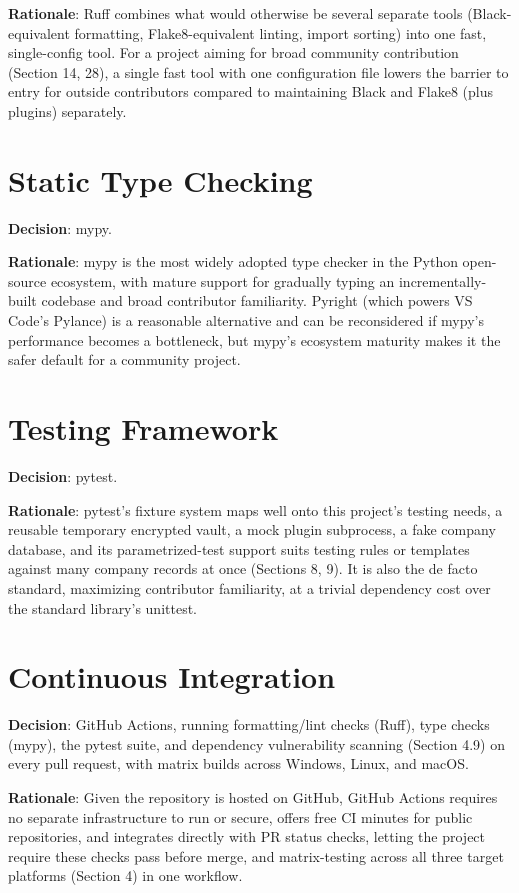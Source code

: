 \textbf{Rationale}:  Ruff combines what would otherwise be several separate tools (Black-equivalent formatting, Flake8-equivalent linting, import sorting) into one fast, single-config tool. For a project aiming for broad community contribution (Section 14, 28), a single fast tool with one configuration file lowers the barrier to entry for outside contributors compared to maintaining Black and Flake8 (plus plugins) separately.
\section{Static Type Checking}
\textbf{Decision}:  mypy.

\textbf{Rationale}:  mypy is the most widely adopted type checker in the Python open-source ecosystem, with mature support for gradually typing an incrementally-built codebase and broad contributor familiarity. Pyright (which powers VS Code's Pylance) is a reasonable alternative and can be reconsidered if mypy's performance becomes a bottleneck, but mypy's ecosystem maturity makes it the safer default for a community project.
\section{Testing Framework}
\textbf{Decision}:  pytest.

\textbf{Rationale}:  pytest's fixture system maps well onto this project's testing needs, a reusable temporary encrypted vault, a mock plugin subprocess, a fake company database, and its parametrized-test support suits testing rules or templates against many company records at once (Sections 8, 9). It is also the de facto standard, maximizing contributor familiarity, at a trivial dependency cost over the standard library's unittest.
\section{Continuous Integration}
\textbf{Decision}:  GitHub Actions, running formatting/lint checks (Ruff), type checks (mypy), the pytest suite, and dependency vulnerability scanning (Section 4.9) on every pull request, with matrix builds across Windows, Linux, and macOS.

\textbf{Rationale}:  Given the repository is hosted on GitHub, GitHub Actions requires no separate infrastructure to run or secure, offers free CI minutes for public repositories, and integrates directly with PR status checks, letting the project require these checks pass before merge, and matrix-testing across all three target platforms (Section 4) in one workflow.
